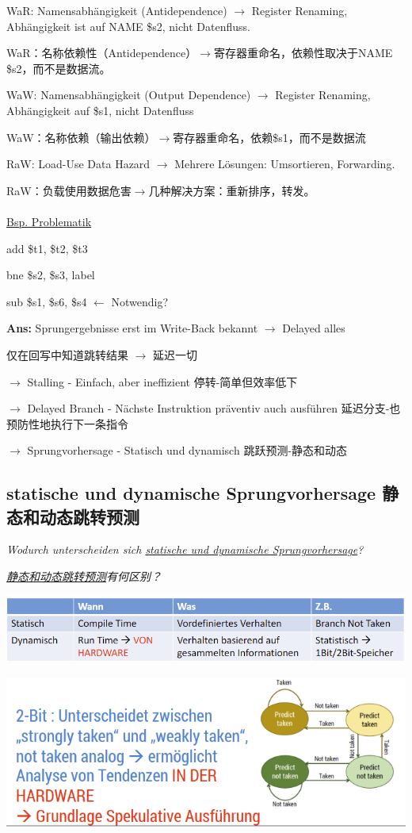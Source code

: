 \documentclass[fleqn]{article}
\begin{document}
WaR: Namensabhängigkeit (Antidependence) $\rightarrow$ Register Renaming, Abhängigkeit ist auf NAME \$s2, nicht Datenfluss.

WaR：名称依赖性（Antidependence）$ \rightarrow $寄存器重命名，依赖性取决于NAME \$s2，而不是数据流。

WaW: Namensabhängigkeit (Output Dependence) $\rightarrow$ Register Renaming, Abhängigkeit auf \$s1, nicht Datenfluss

WaW：名称依赖（输出依赖）$ \rightarrow $寄存器重命名，依赖\$s1，而不是数据流

RaW: Load-Use Data Hazard $\rightarrow$ Mehrere Lösungen: Umsortieren, Forwarding.

RaW：负载使用数据危害$ \rightarrow $几种解决方案：重新排序，转发。
\\
\\
\noindent\underline{Bsp. Problematik}

add \$t1, \$t2, \$t3

bne \$s2, \$s3, label

sub \$s1, \$s6, \$s4 \qquad\qquad $\leftarrow$ Notwendig?

\textbf{Ans:} Sprungergebnisse erst im Write-Back bekannt $\rightarrow$ Delayed alles

仅在回写中知道跳转结果 $\rightarrow$ 延迟一切

$\rightarrow$ Stalling - Einfach, aber ineffizient 停转-简单但效率低下

$\rightarrow$ Delayed Branch - Nächste Instruktion präventiv auch ausführen 延迟分支-也预防性地执行下一条指令

$\rightarrow$ Sprungvorhersage - Statisch und dynamisch 跳跃预测-静态和动态

\subsection{statische und dynamische Sprungvorhersage 静态和动态跳转预测}

\textit{Wodurch unterscheiden sich \underline{statische und dynamische Sprungvorhersage}?}

\noindent\textit{\underline{静态和动态跳转预测}有何区别？}

\begin{center}
    \includegraphics[scale=0.5]{34.png}

    \includegraphics[scale=0.6]{35.png}
\end{center}
\end{document}
